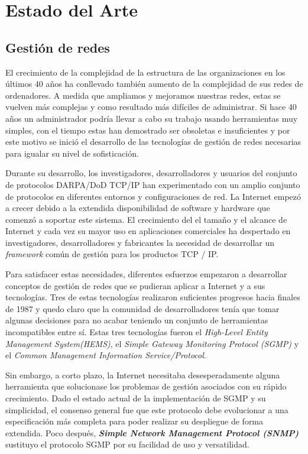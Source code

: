 \chapter{Estado del Arte\label{sec:estado_del_arte}}

\section{Gestión de redes\label{sec:gestion_redes}}
El crecimiento de la complejidad de la estructura de las organizaciones en los últimos 40 años ha conllevado también aumento de la complejidad de sus redes de ordenadores. A medida que ampliamos y mejoramos nuestras redes, estas se vuelven más complejas y como resultado más difíciles de administrar. Si hace 40 años un administrador podría llevar a cabo su trabajo usando herramientas muy simples, con el tiempo estas han demostrado ser obsoletas e insuficientes y por este motivo se inició el desarrollo de las tecnologías de gestión de redes necesarias para igualar su nivel de sofisticación.

Durante su desarrollo, los investigadores, desarrolladores y usuarios del conjunto de protocolos DARPA/DoD TCP/IP han experimentado con un amplio conjunto de protocolos en diferentes entornos y configuraciones de red. La Internet empezó a crecer debido a la extendida disponibilidad de software y hardware que comenzó a soportar este sistema. El crecimiento del el tamaño y el alcance de Internet y cada vez su mayor uso en aplicaciones comerciales ha despertado en investigadores, desarrolladores y fabricantes la necesidad de desarrollar un \textit{framework} común de gestión para los productos TCP / IP.

Para satisfacer estas necesidades, diferentes esfuerzos empezaron a desarrollar conceptos de gestión de redes que se pudieran aplicar a Internet y a sus tecnologías. Tres de estas tecnologías realizaron suficientes progresos hacia finales de 1987 y quedo claro que la comunidad de desarrolladores tenía que tomar algunas decisiones para no acabar teniendo un conjunto de herramientas incompatibles entre sí. Estas tres tecnologías fueron el \textit{High-Level Entity Management System(HEMS)}, el \textit{Simple Gateway Monitoring Protocol (SGMP)} y el \textit{Common Management Information Service/Protocol}.

Sin embargo, a corto plazo, la Internet necesitaba desesperadamente alguna herramienta que solucionase los problemas de gestión asociados con su rápido crecimiento. Dado el estado actual de la implementación de SGMP y su simplicidad, el consenso general fue que este protocolo debe evolucionar a una especificación más completa para poder realizar su despliegue de forma extendida. Poco después, \textbf{\textit{Simple Network Management Protocol (SNMP) }} sustituyo el protocolo SGMP por su facilidad de uso y versatilidad.

